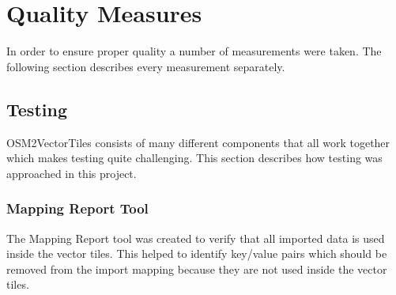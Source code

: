 \chapter{Quality Measures}\label{quality-measures}

In order to ensure proper quality a number of measurements were taken. The following section describes every measurement separately.

\section{Testing}\label{testing}

OSM2VectorTiles consists of many different components that all work together which makes testing quite challenging. This section describes how testing was approached in this project.

\subsection{Mapping Report Tool}

The Mapping Report tool was created to verify that all imported \osm{} data is used inside the vector tiles. This helped to identify \osm{} key/value pairs which should be removed from the import mapping because they are not used inside the vector tiles.

